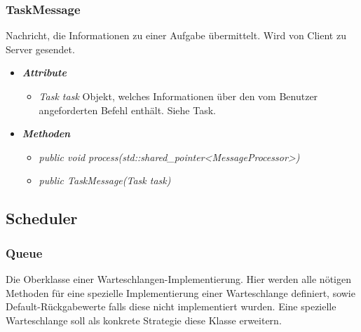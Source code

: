\documentclass[a4paper,12pt]{article}
\begin{document}
\subsubsection{TaskMessage}

Nachricht, die Informationen zu einer Aufgabe übermittelt. Wird von Client zu Server gesendet.

	\begin{itemize}[label={}]

	\item\textit{\textbf{Attribute}}
		\begin{itemize}[label={\textbullet}]
			\item\textit{Task task} Objekt, welches Informationen über den vom Benutzer angeforderten Befehl enthält. Siehe Task.
			
		\end{itemize}

	\item\textit{\textbf{Methoden}}
		\begin{itemize}[label={\textbullet}]
			\item\textit{public void process(std::shared\_pointer<MessageProcessor>)}
			\item\textit{public TaskMessage(Task task)}

		\end{itemize}
\end{itemize}
\subsection{Scheduler}

\subsubsection{Queue}

Die Oberklasse einer Warteschlangen-Implementierung. Hier werden alle nötigen Methoden für eine spezielle Implementierung einer Warteschlange definiert, sowie Default-Rückgabewerte falls diese nicht implementiert wurden. Eine spezielle Warteschlange soll als konkrete Strategie diese Klasse erweitern.
\end{document}

